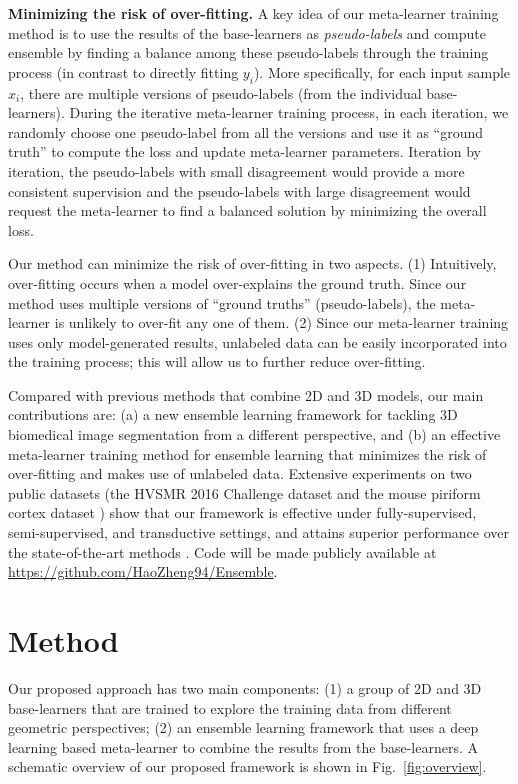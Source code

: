\documentclass[letterpaper]{article} %
\begin{document}
\textbf{Minimizing the risk of over-fitting.}
A key idea of our meta-learner training method is to use the results of the base-learners as {\it pseudo-labels} \cite{lee2013pseudo} and compute ensemble by finding a balance among these pseudo-labels through the training process (in contrast to directly fitting $y_i$). More specifically, for each input sample $x_i$, there are multiple versions of pseudo-labels (from the individual base-learners). During the iterative meta-learner training process, in each iteration, we randomly choose one pseudo-label from all the versions and use it as ``ground truth'' to compute the loss and update meta-learner parameters.
Iteration by iteration, the pseudo-labels with small disagreement would provide a more consistent supervision and the pseudo-labels with large disagreement would request the meta-learner to find a balanced solution by minimizing the overall loss.

Our method can minimize the risk of over-fitting in two aspects. (1) Intuitively, over-fitting occurs when a model over-explains the ground truth. Since our method uses multiple versions of ``ground truths'' (pseudo-labels), the meta-learner is unlikely to over-fit any one of them. (2) Since our meta-learner training uses only model-generated results, unlabeled data can be easily incorporated into the training process; this will allow us to further reduce over-fitting.




Compared with previous methods that combine 2D and 3D models, our main contributions are:
(a) a new ensemble learning framework for tackling 3D biomedical image segmentation from a different perspective, and
(b) an effective meta-learner training method for ensemble learning that minimizes the risk of over-fitting and makes use of unlabeled data.
Extensive experiments on two public datasets (the HVSMR 2016 Challenge dataset \cite{pace2015interactive} and the mouse piriform cortex dataset \cite{lee2015recursive}) show that our framework is effective under fully-supervised, semi-supervised, and transductive settings, and attains superior performance over the state-of-the-art methods \cite{yu2017automatic,neuron2,chen2017voxresnet}.
Code will be made publicly available at
\mbox{\url{https://github.com/HaoZheng94/Ensemble}}.


\section{Method}\label{Sec-Method}
Our proposed approach has two main components:
(1) a group of 2D and 3D base-learners that are trained to explore the training data from different geometric perspectives;
(2) an ensemble learning framework that uses a deep learning based meta-learner to combine the results from the base-learners. A schematic overview of our proposed framework is shown in Fig.~\ref{fig:overview}.
\end{document}
